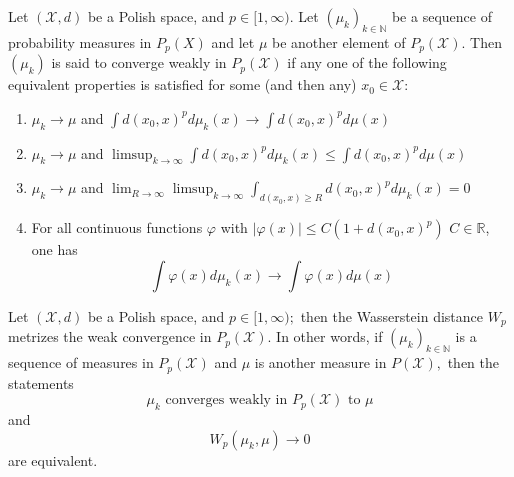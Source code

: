 \begin{defn}
	Let \( ( \mathcal { X } , d ) \) be a Polish space, and \( p \in [ 1 , \infty ) \). Let \( \left( \mu _ { k } \right) _ { k \in \mathbb { N } } \) be a sequence of probability measures in \( P _ { p } ( X ) \) and let \( \mu \) be another element of \( P _ { p } ( \mathcal { X } ) . \) Then \( \left( \mu _ { k } \right) \) is said to converge weakly in \( P _ { p } ( \mathcal { X } ) \) if any one of the following equivalent properties is satisfied for some (and then any) \( x _ { 0 } \in \mathcal { X }: \)
	\begin{enumerate}
		\item \( \mu _ { k } \longrightarrow \mu \) and \( \int d \left( x _ { 0 } , x \right) ^ { p } d \mu _ { k } ( x ) \longrightarrow \int d \left( x _ { 0 } , x \right) ^ { p } d \mu ( x ) \)
		\item \( \mu _ { k } \longrightarrow \mu \) and \( \limsup _ { k \rightarrow \infty } \int d \left( x _ { 0 } , x \right) ^ { p } d \mu _ { k } ( x ) \leq \int d \left( x _ { 0 } , x \right) ^ { p } d \mu ( x ) \)
		\item \( \mu _ { k } \longrightarrow \mu \) and \( \lim _ { R \rightarrow \infty } \limsup _ { k \rightarrow \infty } \int _ { d \left( x _ { 0 } , x \right) \geq R } d \left( x _ { 0 } , x \right) ^ { p } d \mu _ { k } ( x ) = 0 \)
		\item For all continuous functions \( \varphi \) with \( | \varphi ( x ) | \leq C \left( 1 + d \left( x _ { 0 } , x \right) ^ { p } \right) \)
		      \( C \in \mathbb { R } \), one has
		      \[ \int \varphi ( x ) d \mu _ { k } ( x ) \longrightarrow \int \varphi ( x ) d \mu ( x ) \]
	\end{enumerate}
\end{defn}

\begin{thm}
	\label{thm:Wp_metrizes_weak_convergence}
	Let \( ( \mathcal { X } , d ) \) be a Polish space, and \( p \in [ 1 , \infty ) ; \) then the Wasserstein distance \( W _ { p } \) metrizes the weak convergence in \( P _ { p } ( \mathcal { X } ) . \) In other words, if \( \left( \mu _ { k } \right) _ { k \in \mathbb { N } } \) is a sequence of measures in \( P _ { p } ( \mathcal { X } ) \) and \( \mu \) is another measure in \( P ( \mathcal { X } ) , \) then the statements
	\[ \mu _ { k } \text { converges weakly in } P _ { p } ( \mathcal { X } ) \text { to } \mu \]
	and
	\[ W _ { p } \left( \mu _ { k } , \mu \right) \longrightarrow 0 \]
	are equivalent.
\end{thm}

